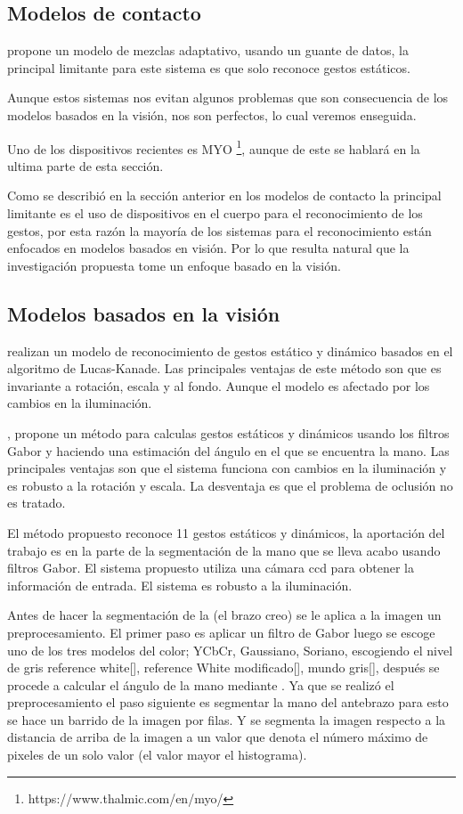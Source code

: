 \subsection{Modelos de contacto}

\citep{Yoon2012} propone un modelo de mezclas adaptativo, usando un guante de datos, la principal limitante para este sistema es que solo reconoce gestos estáticos. 

Aunque estos sistemas nos evitan algunos problemas que son consecuencia de los modelos basados en la visión, nos son perfectos, lo cual veremos enseguida.  

Uno de los dispositivos recientes es MYO \footnote{https://www.thalmic.com/en/myo/}, aunque de este se hablar\'a en la ultima parte de esta secci\'on. 

Como se describi\'o en la secci\'on anterior en los modelos de contacto la principal limitante es el uso de dispositivos en el cuerpo para el reconocimiento de los gestos, por esta raz\'on la mayor\'ia de los sistemas para el reconocimiento están enfocados en modelos basados en visi\'on. Por lo que resulta natural que la investigaci\'on propuesta tome un enfoque basado en la visi\'on.

\subsection{Modelos basados en la visi\'on}  

\cite{Premaratne2013} realizan un modelo de reconocimiento de gestos est\'atico y din\'amico basados en el algoritmo de Lucas-Kanade. Las principales ventajas de este m\'etodo son que es invariante a rotaci\'on, escala y al fondo. Aunque el modelo es afectado por los cambios en la iluminaci\'on.

\citep{Huang2011}, propone un método para calculas gestos estáticos y dinámicos usando los filtros Gabor y haciendo una estimación del \'angulo en el que se encuentra la mano. Las principales ventajas son que el sistema funciona con cambios en la iluminaci\'on y es robusto a la rotaci\'on y escala. La desventaja es que el problema de oclusi\'on no es tratado.

El método propuesto reconoce 11 gestos estáticos y dinámicos,  la aportación del trabajo es en la parte de la segmentación de la mano que se lleva acabo usando filtros Gabor. El sistema propuesto utiliza una cámara ccd para obtener la información de entrada. El sistema es robusto a la iluminación. 
 
Antes de hacer la segmentación de la (el brazo creo) se le aplica a la imagen un preprocesamiento. El primer paso es aplicar un filtro de Gabor luego  se escoge uno de los tres modelos del color; YCbCr, Gaussiano, Soriano, escogiendo el nivel de gris reference white[], reference White modificado[], mundo gris[], después se procede a calcular el ángulo de la mano mediante .  
Ya que se realizó el preprocesamiento el paso siguiente es segmentar la mano del antebrazo para esto se hace un barrido de la imagen por filas. Y se segmenta la imagen respecto a la distancia de arriba de la imagen a un valor que denota el número máximo de pixeles de un solo valor (el valor mayor el histograma).

